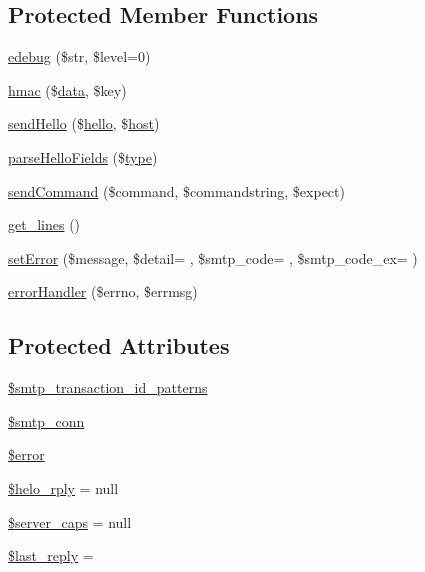 \subsection*{Protected Member Functions}
\begin{DoxyCompactItemize}
\item 
\hyperlink{class_s_m_t_p_a946b64f536f4f3803f70603873590e71}{edebug} (\$str, \$level=0)
\item 
\hyperlink{class_s_m_t_p_ab64534872ef0e960ac18d1a383781830}{hmac} (\$\hyperlink{class_s_m_t_p_a3893229db738c613fc3f0914d73e989d}{data}, \$key)
\item 
\hyperlink{class_s_m_t_p_a2bbc3656b8c44e29ee5621ee7afc891f}{send\+Hello} (\$\hyperlink{class_s_m_t_p_aa57f991acecc5b519b790fad49acbe78}{hello}, \$\hyperlink{ossn_8config_8db_8example_8php_a5bc8babfba069f855b3288f34a926b5a}{host})
\item 
\hyperlink{class_s_m_t_p_a526777ee97d964128c3c8c235f318437}{parse\+Hello\+Fields} (\$\hyperlink{_ossn_wall_2actions_2wall_2post_2group_8php_a2dc1bb4e1ed0029daa81ac0776b14b51}{type})
\item 
\hyperlink{class_s_m_t_p_ad277f27506e6e9cdea6073ffa5f7b476}{send\+Command} (\$command, \$commandstring, \$expect)
\item 
\hyperlink{class_s_m_t_p_a4079f7abca5539c318c911c5249b6dff}{get\+\_\+lines} ()
\item 
\hyperlink{class_s_m_t_p_acb1f7e7632a8f30426e4dad7f106c79f}{set\+Error} (\$message, \$detail= \textquotesingle{}\textquotesingle{}, \$smtp\+\_\+code= \textquotesingle{}\textquotesingle{}, \$smtp\+\_\+code\+\_\+ex= \textquotesingle{}\textquotesingle{})
\item 
\hyperlink{class_s_m_t_p_af80ff3065597341c90219290fdecca07}{error\+Handler} (\$errno, \$errmsg)
\end{DoxyCompactItemize}
\subsection*{Protected Attributes}
\begin{DoxyCompactItemize}
\item 
\hyperlink{class_s_m_t_p_a8a963ff3fd663a9a55ee15aa4386f09a}{\$smtp\+\_\+transaction\+\_\+id\+\_\+patterns}
\item 
\hyperlink{class_s_m_t_p_a11fc42e903bf60dedd8cd6e06e84e419}{\$smtp\+\_\+conn}
\item 
\hyperlink{class_s_m_t_p_aeba2ab722cedda53dbb7ec1a59f45550}{\$error}
\item 
\hyperlink{class_s_m_t_p_ab3ac5873d7f4a2cb378440532aec336e}{\$helo\+\_\+rply} = null
\item 
\hyperlink{class_s_m_t_p_ac93a6162b0ecb254be5fdcaa385b2c5c}{\$server\+\_\+caps} = null
\item 
\hyperlink{class_s_m_t_p_a02b4360fc11497c217a66518ca6f09ff}{\$last\+\_\+reply} = \textquotesingle{}\textquotesingle{}
\end{DoxyCompactItemize}


